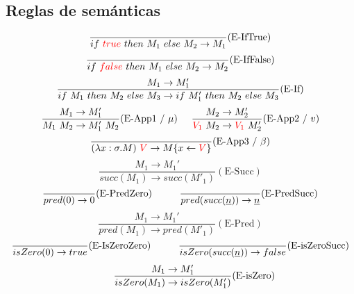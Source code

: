 \documentclass[10pt,a4paper]{article}
\begin{document}
\subsection*{Reglas de semánticas}
\begin{equation*}
\frac{}{if~ \color{red}true\color{black}~ then~ M_1~ else~ M_2 \to M_1}(\text{E-IfTrue})
\end{equation*}
\vspace*{5mm}
\begin{equation*}
\frac{}{if~ \color{red}false\color{black}~ then~ M_1~ else~ M_2 \to M_2}(\text{E-IfFalse})
\end{equation*}
\vspace*{5mm}
\begin{equation*}
\frac{M_1\to M'_1}{if~ M_1~ then~ M_2~ else~ M_3\to if~ M'_1~ then~ M_2~ else~ M_3}(\text{E-If})
\end{equation*}
\vspace*{5mm}
\begin{equation*}
\frac{M_1\to M'_1}{M_1~M_2 \to 
M'_1~M_2}(\text{E-App1}~ /~ \mu)
\hspace*{5mm}
\frac{M_2 \to M'_2}{\color{red}V_1\color{black}~M_2 \to 
	\color{red}V_1\color{black}~M'_2}(\text{E-App2}~/~v)
\end{equation*}	
\vspace*{5mm}
\begin{equation*}
\frac{}{(\lambda x: \sigma . M)~\color{red}V\color{black} \to 
	M\{x\leftarrow\color{red}V\color{black}\}}(\text{E-App3}~/~\beta)
\end{equation*}
\vspace*{5mm}
\begin{equation*}
\frac{M_1\to M_1'}{succ(M_1)\to succ(M'_1)}(\text{E-Succ})
\end{equation*}
\vspace*{5mm}
\begin{equation*}
\frac{}{pred(0)\to 0}(\text{E-PredZero})\hspace*{1cm}\frac{}{pred(succ(\underline{n}))\to \underline{n}}(\text{E-PredSucc})
\end{equation*}
\vspace*{5mm}
\begin{equation*}
\frac{M_1\to M_1'}{pred(M_1)\to pred(M'_1)}(\text{E-Pred})
\end{equation*}
\vspace*{5mm}
\begin{equation*}
\frac{}{isZero(0)\to true}(\text{E-IsZeroZero})\hspace*{1cm}\frac{}{isZero(succ(\underline{n}))\to false}(\text{E-isZeroSucc})
\end{equation*}
\vspace*{5mm}
\begin{equation*}
\hspace*{1cm}\frac{M_1\to M'_1}{isZero(M_1)\to isZero(M_1')}(\text{E-isZero})
\end{equation*}
\end{document}
